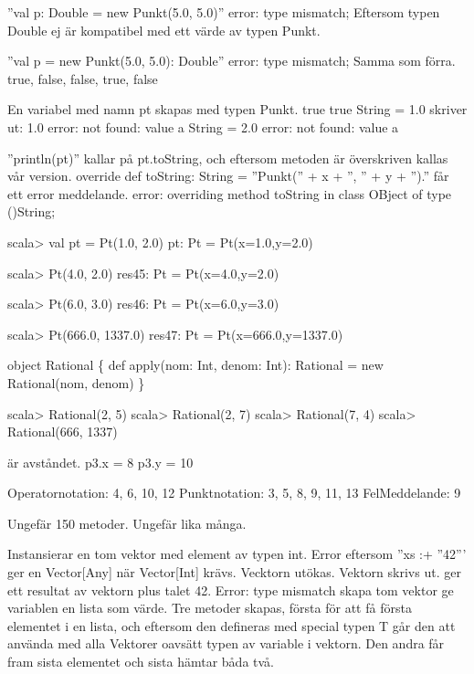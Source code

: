 ''val p: Double = new Punkt(5.0, 5.0)'' error: type mismatch;
Eftersom typen Double ej är kompatibel med ett värde av typen Punkt.

''val p = new Punkt(5.0, 5.0): Double'' error: type mismatch;
Samma som förra.
\Subtask 
true, false, false, true, false

\Task %
\Subtask 
En variabel med namn pt skapas med typen Punkt.
true
true
String = 1.0
skriver ut: 1.0
error: not found: value a
String = 2.0
error: not found: value a

\Task %
\Subtask 
''println(pt)'' kallar på pt.toString, och eftersom metoden är överskriven kallas vår version.
\Subtask 
override def toString: String = ''Punkt('' + x + '', '' + y + '').''
\Subtask 
får ett error meddelande.
error: overriding method toString in class OBject of type ()String;

\Task %
\Subtask 
\begin{REPL}
scala> val pt = Pt(1.0, 2.0)
pt: Pt = Pt(x=1.0,y=2.0)

scala> Pt(4.0, 2.0)
res45: Pt = Pt(x=4.0,y=2.0)

scala> Pt(6.0, 3.0)
res46: Pt = Pt(x=6.0,y=3.0)

scala> Pt(666.0, 1337.0)
res47: Pt = Pt(x=666.0,y=1337.0)
\end{REPL}
\Subtask {}
\Subtask {}
\Subtask 
\begin{REPLnonum}
object Rational \{ 
def apply(nom: Int, denom: Int): Rational = new Rational(nom, denom)
\}
\end{REPLnonum}
\Subtask 
\begin{REPL}
scala> Rational(2, 5)
scala> Rational(2, 7)
scala> Rational(7, 4)
scala> Rational(666, 1337)
\end{REPL}

\Task %
\Subtask {}

\Task %
 är avståndet.
\Subtask 
p3.x = 8
p3.y = 10

\Task %
\Subtask 
Operatornotation:	4, 6, 10, 12
Punktnotation:		3, 5, 8, 9, 11, 13
FelMeddelande:		9

\Task %
\Subtask  Ungefär 150 metoder.
\Subtask  Ungefär lika många.

\Task %
\Subtask 
Instansierar en tom vektor med element av typen int.
Error eftersom ''xs :+ ''42''' ger en Vector[Any] när Vector[Int] krävs.
Vecktorn utökas.
Vektorn skrivs ut.
ger ett resultat av vektorn plus talet 42.
Error: type mismatch
skapa tom vektor
ge variablen en lista som värde.
\Subtask 
Tre metoder skapas, första för att få första elementet i en lista, och eftersom den defineras med special typen T går den att använda med alla Vektorer oavsätt typen av variable i vektorn. Den andra får fram sista elementet och sista hämtar båda två.

